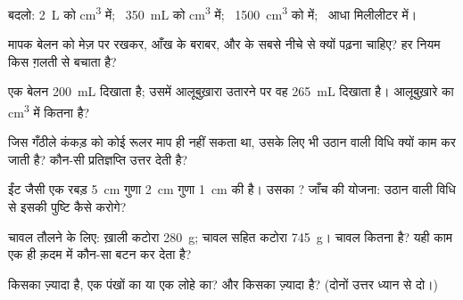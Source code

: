 \begin{exercise}[$\star$]\label{exo:g6:mass-and-volume:2}
बदलो: \qty{2}{L} को \unit{cm^3} में; \ \qty{350}{mL} को
\unit{cm^3} में; \ \qty{1500}{cm^3} को  में; \ आधा 
मिलीलीटर में।
\end{exercise}

\begin{exercise}[$\star$]\label{exo:g6:mass-and-volume:3}
मापक बेलन को मेज़ पर रखकर, आँख के बराबर, और  के सबसे नीचे से
क्यों पढ़ना चाहिए? हर नियम किस ग़लती से बचाता है?
\end{exercise}

\begin{exercise}[$\star$]\label{exo:g6:mass-and-volume:4}
एक बेलन \qty{200}{mL} दिखाता है; उसमें आलूबुख़ारा उतारने पर वह
\qty{265}{mL} दिखाता है। आलूबुख़ारे का  \unit{cm^3} में कितना है?
\end{exercise}

\begin{exercise}[$\star$]\label{exo:g6:mass-and-volume:5}
जिस गँठीले कंकड़ को कोई रूलर माप ही नहीं सकता था, उसके लिए भी उठान
वाली विधि क्यों काम कर जाती है? कौन-सी प्रतिज्ञप्ति उत्तर देती है?
\end{exercise}

\begin{exercise}[$\star$]\label{exo:g6:mass-and-volume:6}
ईंट जैसी एक रबड़ \qty{5}{cm} गुणा \qty{2}{cm} गुणा \qty{1}{cm} की
है। उसका ? जाँच की योजना: उठान वाली विधि से इसकी पुष्टि कैसे
करोगे?
\end{exercise}

\begin{exercise}[$\star$]\label{exo:g6:mass-and-volume:7}
चावल तौलने के लिए: ख़ाली कटोरा \qty{280}{g}; चावल सहित कटोरा
\qty{745}{g}। चावल कितना है? यही काम एक ही क़दम में कौन-सा बटन कर
देता है?
\end{exercise}

\begin{exercise}[$\star$]\label{exo:g6:mass-and-volume:8}
 किसका ज़्यादा है, एक  पंखों का या एक  लोहे का?
और  किसका ज़्यादा है? (दोनों उत्तर ध्यान से दो।)
\end{exercise}

